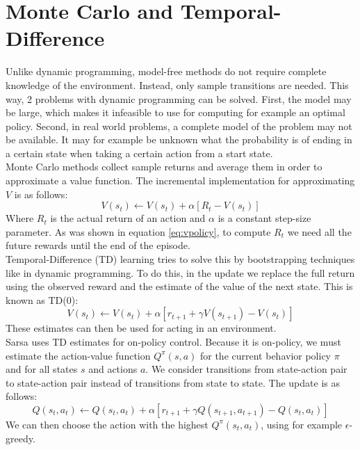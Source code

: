 \section{Monte Carlo and Temporal-Difference}
\label{sub:rl_mctd}
Unlike dynamic programming, model-free methods do not require complete knowledge of the environment.
Instead, only sample transitions are needed.
This way, 2 problems with dynamic programming can be solved.
First, the model may be large, which makes it infeasible to use for computing for example an optimal policy.
Second, in real world problems, a complete model of the problem may not be available.
It may for example be unknown what the probability is of ending in a certain state when taking a certain action from a start state.\\
Monte Carlo methods collect sample returns and average them in order to approximate a value function.
The incremental implementation for approximating $V$ is as follows:
\begin{equation}
V(s_t) \leftarrow V(s_t) + \alpha\left[R_t - V(s_t)\right]
\end{equation}
Where $R_t$ is the actual return of an action and $\alpha$ is a constant step-size parameter. As was shown in equation \ref{eq:vpolicy}, to compute $R_t$ we need all the future rewards until the end of the episode.\\
Temporal-Difference (TD) learning tries to solve this by bootstrapping techniques like in dynamic programming. To do this, in the update we replace the full return using the observed reward and the estimate of the value of the next state. This is known as TD(0):
\begin{equation}
V(s_t) \leftarrow V(s_t) + \alpha\left[r_{t+1}+\gamma V(s_{t+1}) - V(s_t)\right]
\end{equation}
These estimates can then be used for acting in an environment.\\
Sarsa uses TD estimates for on-policy control. Because it is on-policy, we must estimate the action-value function $Q^\pi(s,a)$ for the current behavior policy $\pi$ and for all states $s$ and actions $a$. We consider transitions from state-action pair to state-action pair instead of transitions from state to state. The update is as follows:
\begin{equation}
Q(s_t,a_t) \leftarrow Q(s_t,a_t) + \alpha \left[ r_{t+1} + \gamma Q(s_{t+1},a_{t+1}) - Q(s_t,a_t) \right]
\end{equation}
We can then choose the action with the highest $Q^\pi(s_t,a_t)$, using for example $\epsilon$-greedy.
